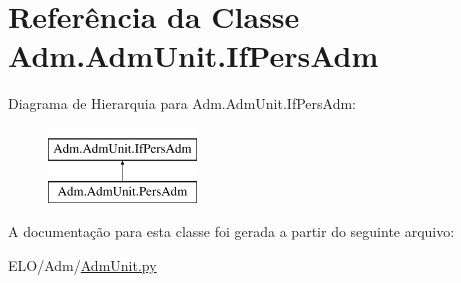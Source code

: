 \hypertarget{classAdm_1_1AdmUnit_1_1IfPersAdm}{\section{Referência da Classe Adm.\-Adm\-Unit.\-If\-Pers\-Adm}
\label{d0/dce/classAdm_1_1AdmUnit_1_1IfPersAdm}
}
Diagrama de Hierarquia para Adm.\-Adm\-Unit.\-If\-Pers\-Adm\-:\begin{figure}[H]
\begin{center}
\leavevmode
\includegraphics[height=2.000000cm]{d0/dce/classAdm_1_1AdmUnit_1_1IfPersAdm}
\end{center}
\end{figure}


A documentação para esta classe foi gerada a partir do seguinte arquivo\-:\begin{DoxyCompactItemize}
\item 
E\-L\-O/\-Adm/\hyperlink{AdmUnit_8py}{Adm\-Unit.\-py}\end{DoxyCompactItemize}
